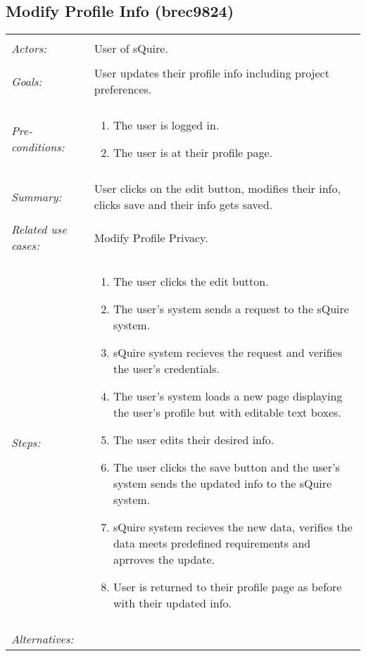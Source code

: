 \documentclass[11pt]{report}
\begin{document}
\subsection{Modify Profile Info (brec9824)}
\begin{tabular}{ p{2cm} p{12cm} }
 \hline
 \\
 \textit{Actors:} & User of sQuire. \\ 
 \\
 \textit{Goals:} & User updates their profile info including project preferences. \\
 \\
 \textit{Pre-conditions:} & \begin{enumerate}
  \item The user is logged in.
  \item The user is at their profile page.
 \end{enumerate} \\
 \\
 \textit{Summary:} & User clicks on the edit button, modifies their info, clicks save and their info gets saved.\\ 
 \\
 \textit{Related use cases:} & Modify Profile Privacy. \\ 
 \\
 \textit{Steps:} & \begin{enumerate}
  \item The user clicks the edit button.
  \item The user's system sends a request to the sQuire system.
  \item sQuire system recieves the request and verifies the user's credentials.
  \item The user's system loads a new page displaying the user's profile but with editable text boxes.
  \item The user edits their desired info.
  \item The user clicks the save button and the user's system sends the updated info to the sQuire system.
  \item sQuire system recieves the new data, verifies the data meets predefined requirements and aprroves the update.
  \item User is returned to their profile page as before with their updated info.
 \end{enumerate} \\
 \\
 \textit{Alternatives:} & \begin{enumerate} 

\end{enumerate}
\end{tabular}
\end{document}
